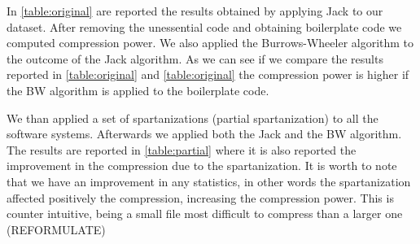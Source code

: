 In \cref{table:original} are reported the results obtained by applying Jack to
our dataset. After removing the unessential code and obtaining boilerplate
code we computed compression power. We also applied the Burrows-Wheeler
algorithm to the outcome of the Jack algorithm. As we can see if we compare
the results reported in \cref{table:original} and \cref{table:original} the
compression power is higher if the BW algorithm is applied to the boilerplate
code.

\begin{table}
  \label{table:original}
  \caption{The results of the compression using the Jack algorithm alone and both Jack and
  Burrows-Wheeler algorithms combined}
  \centering
\end{table}

We than applied a set of spartanizations (partial spartanization) to all the
software systems. Afterwards we applied both the Jack and the BW algorithm.
The results are reported in \cref{table:partial} where it is also
reported the improvement in the compression due to the spartanization. It is
worth to note that we have an improvement in any statistics, in other words the
spartanization affected positively the compression, increasing the compression
power. This is counter intuitive, being a small file most difficult to
compress than a larger one (REFORMULATE)

\begin{table}
  \label{table:partial}
  \caption{The results after performing a partial spartanization of the code, compared
  with the compression ratios obtained with the Jack and Burrows-Wheeler algorithm}
  \centering
\end{table}

